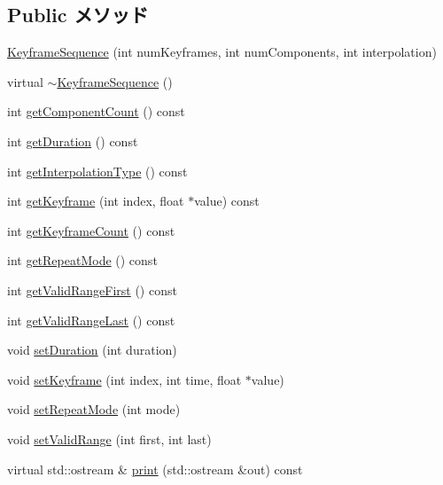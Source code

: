 \subsection*{Public メソッド}
\begin{CompactItemize}
\item 
\hyperlink{classm3g_1_1KeyframeSequence_0c07c479375c11ff94cff02c1267f0d0}{KeyframeSequence} (int numKeyframes, int numComponents, int interpolation)
\item 
virtual \hyperlink{classm3g_1_1KeyframeSequence_464f5929e3302c788ca626c11ca8d656}{$\sim$KeyframeSequence} ()
\item 
int \hyperlink{classm3g_1_1KeyframeSequence_7016f51d2788e78fdd736efd040f5e5e}{getComponentCount} () const 
\item 
int \hyperlink{classm3g_1_1KeyframeSequence_995a5ca5c8c3c993ef167f67cbb5fabe}{getDuration} () const 
\item 
int \hyperlink{classm3g_1_1KeyframeSequence_0d46321e7f46e037508cce88cdf6a487}{getInterpolationType} () const 
\item 
int \hyperlink{classm3g_1_1KeyframeSequence_0fd27047149eedab8b10319768e1fe9a}{getKeyframe} (int index, float $\ast$value) const 
\item 
int \hyperlink{classm3g_1_1KeyframeSequence_4d500a603f25adafd8e6f8b68872dbff}{getKeyframeCount} () const 
\item 
int \hyperlink{classm3g_1_1KeyframeSequence_a356af60b9759d5d3da833773e3c7b73}{getRepeatMode} () const 
\item 
int \hyperlink{classm3g_1_1KeyframeSequence_b7e54386674cefdb8f5fa65ce5435b50}{getValidRangeFirst} () const 
\item 
int \hyperlink{classm3g_1_1KeyframeSequence_aa98cc8d698c482c33a3487c33db27d0}{getValidRangeLast} () const 
\item 
void \hyperlink{classm3g_1_1KeyframeSequence_d7406d5e0e2f398e05e3563d099dfdf1}{setDuration} (int duration)
\item 
void \hyperlink{classm3g_1_1KeyframeSequence_700d02a4ac28514016721e4b1d2bcf96}{setKeyframe} (int index, int time, float $\ast$value)
\item 
void \hyperlink{classm3g_1_1KeyframeSequence_e5cd1486fe0a8a61cf96816e976d7f87}{setRepeatMode} (int mode)
\item 
void \hyperlink{classm3g_1_1KeyframeSequence_b5a824131cef547816366141afe0339a}{setValidRange} (int first, int last)
\item 
virtual std::ostream \& \hyperlink{classm3g_1_1KeyframeSequence_6fea17fa1532df3794f8cb39cb4f911f}{print} (std::ostream \&out) const 
\end{CompactItemize}
